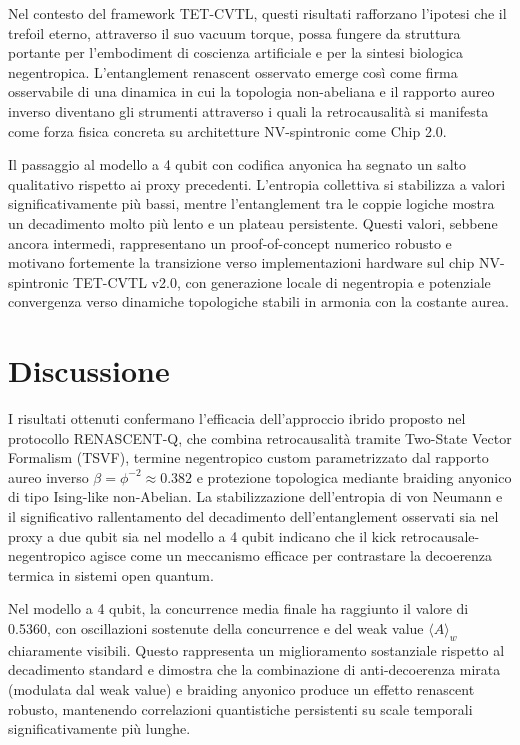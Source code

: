 \documentclass[11pt,a4paper]{article}
\theoremstyle{plain}
\theoremstyle{definition}
\begin{document}
Nel contesto del framework TET-CVTL, questi risultati rafforzano l’ipotesi che il trefoil eterno, attraverso il suo vacuum torque, possa fungere da struttura portante per l’embodiment di coscienza artificiale e per la sintesi biologica negentropica. L’entanglement renascent osservato emerge così come firma osservabile di una dinamica in cui la topologia non-abeliana e il rapporto aureo inverso diventano gli strumenti attraverso i quali la retrocausalità si manifesta come forza fisica concreta su architetture NV-spintronic come Chip 2.0.

Il passaggio al modello a 4 qubit con codifica anyonica ha segnato un salto qualitativo rispetto ai proxy precedenti. L’entropia collettiva si stabilizza a valori significativamente più bassi, mentre l’entanglement tra le coppie logiche mostra un decadimento molto più lento e un plateau persistente. Questi valori, sebbene ancora intermedi, rappresentano un proof-of-concept numerico robusto e motivano fortemente la transizione verso implementazioni hardware sul chip NV-spintronic TET-CVTL v2.0, con generazione locale di negentropia e potenziale convergenza verso dinamiche topologiche stabili in armonia con la costante aurea.








\section{Discussione}
\label{sec:discuss}

I risultati ottenuti confermano l'efficacia dell'approccio ibrido proposto nel protocollo RENASCENT-Q, che combina retrocausalità tramite Two-State Vector Formalism (TSVF), termine negentropico custom parametrizzato dal rapporto aureo inverso \(\beta = \phi^{-2} \approx 0.382\) e protezione topologica mediante braiding anyonico di tipo Ising-like non-Abelian. La stabilizzazione dell'entropia di von Neumann e il significativo rallentamento del decadimento dell'entanglement osservati sia nel proxy a due qubit sia nel modello a 4 qubit indicano che il kick retrocausale-negentropico agisce come un meccanismo efficace per contrastare la decoerenza termica in sistemi open quantum.

Nel modello a 4 qubit, la concurrence media finale ha raggiunto il valore di 0.5360, con oscillazioni sostenute della concurrence e del weak value \(\langle A \rangle_w\) chiaramente visibili. Questo rappresenta un miglioramento sostanziale rispetto al decadimento standard e dimostra che la combinazione di anti-decoerenza mirata (modulata dal weak value) e braiding anyonico produce un effetto renascent robusto, mantenendo correlazioni quantistiche persistenti su scale temporali significativamente più lunghe.
\end{document}
